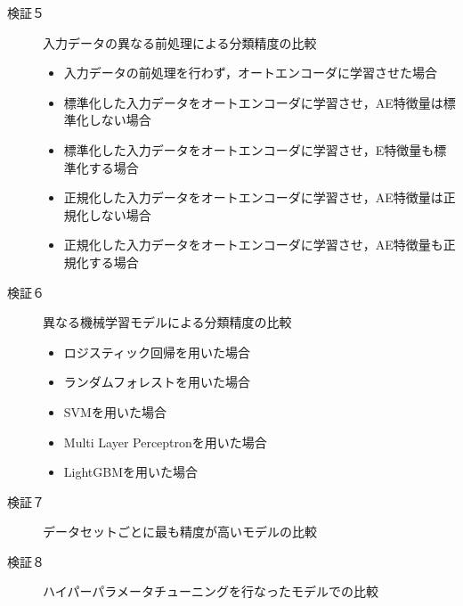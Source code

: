 \begin{description}
    \item [検証５] 入力データの異なる前処理による分類精度の比較
    \begin{itemize}
        \item 入力データの前処理を行わず，オートエンコーダに学習させた場合
        \item 標準化した入力データをオートエンコーダに学習させ，AE特徴量は標準化しない場合
        \item 標準化した入力データをオートエンコーダに学習させ，E特徴量も標準化する場合
        \item 正規化した入力データをオートエンコーダに学習させ，AE特徴量は正規化しない場合
        \item 正規化した入力データをオートエンコーダに学習させ，AE特徴量も正規化する場合
    \end{itemize}

    \item [検証６] 異なる機械学習モデルによる分類精度の比較
    \begin{itemize}
        \item ロジスティック回帰を用いた場合
        \item ランダムフォレストを用いた場合
        \item SVMを用いた場合
        \item Multi Layer Perceptronを用いた場合
        \item LightGBMを用いた場合
    \end{itemize}

    \item [検証７] データセットごとに最も精度が高いモデルの比較

    \item [検証８] ハイパーパラメータチューニングを行なったモデルでの比較
    

\end{description}